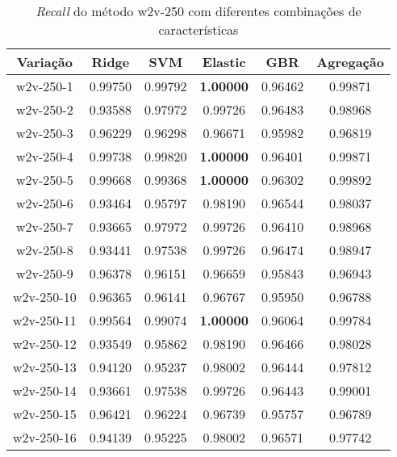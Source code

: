 \begin{table}[H]
\centering
\begin{tabular}{|c| c c  c  c  c| }
\hline
Variação &  Ridge & SVM & Elastic & GBR & Agregação  \\ 
\hline
w2v-250-1 & 0.99750 & 0.99792 & \textbf{1.00000} & 0.96462 & 0.99871 \\
\hline
w2v-250-2 & 0.93588 & 0.97972 & 0.99726 & 0.96483 & 0.98968 \\
\hline
w2v-250-3 & 0.96229 & 0.96298 & 0.96671 & 0.95982 & 0.96819 \\
\hline
w2v-250-4 & 0.99738 & 0.99820 & \textbf{1.00000} & 0.96401 & 0.99871 \\
\hline
w2v-250-5 & 0.99668 & 0.99368 & \textbf{1.00000} & 0.96302 & 0.99892 \\
\hline
w2v-250-6 & 0.93464 & 0.95797 & 0.98190 & 0.96544 & 0.98037 \\
\hline
w2v-250-7 & 0.93665 & 0.97972 & 0.99726 & 0.96410 & 0.98968 \\
\hline
w2v-250-8 & 0.93441 & 0.97538 & 0.99726 & 0.96474 & 0.98947 \\
\hline
w2v-250-9 & 0.96378 & 0.96151 & 0.96659 & 0.95843 & 0.96943 \\
\hline
w2v-250-10 & 0.96365 & 0.96141 & 0.96767 & 0.95950 & 0.96788 \\
\hline
w2v-250-11 & 0.99564 & 0.99074 & \textbf{1.00000} & 0.96064 & 0.99784 \\
\hline
w2v-250-12 & 0.93549 & 0.95862 & 0.98190 & 0.96466 & 0.98028 \\
\hline
w2v-250-13 & 0.94120 & 0.95237 & 0.98002 & 0.96444 & 0.97812 \\
\hline
w2v-250-14 & 0.93661 & 0.97538 & 0.99726 & 0.96443 & 0.99001 \\
\hline
w2v-250-15 & 0.96421 & 0.96224 & 0.96739 & 0.95757 & 0.96789 \\
\hline
w2v-250-16 & 0.94139 & 0.95225 & 0.98002 & 0.96571 & 0.97742 \\
\hline
\end{tabular}
\caption{\textit{Recall} do método w2v-250 com diferentes combinações de características}
\label{tab:recallw2v250}
\end{table}

